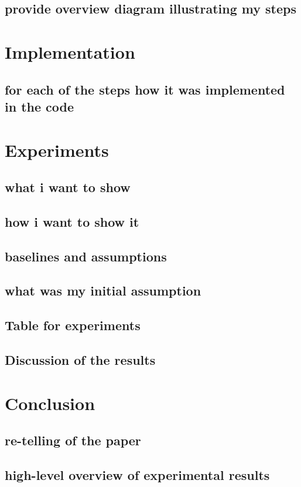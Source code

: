 \documentclass[a4paper,11pt,oneside]{memoir}
\begin{document}
\section{provide overview diagram illustrating my steps}

\chapter{Implementation}
\section{ for each of the steps how it was implemented in the code}

\chapter{Experiments}
\section{what i want to show}
\section{how i want to show it}
\section{baselines and assumptions}
\section{what was my initial assumption}
\section{Table for experiments}
\section{Discussion of the results}

\chapter{Conclusion}
\section{re-telling of the paper}
\section{high-level overview of experimental results}
\end{document}
